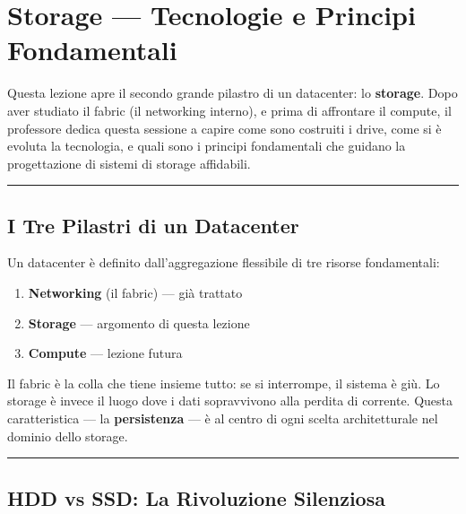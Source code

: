 \documentclass[
  italian,
  openany]{book}
\providecommand{\tightlist}{%
  \setlength{\itemsep}{0pt}\setlength{\parskip}{0pt}}
\begin{document}
\newpage

\chapter{Storage --- Tecnologie e Principi
Fondamentali}\label{storage-tecnologie-e-principi-fondamentali}

Questa lezione apre il secondo grande pilastro di un datacenter: lo
\textbf{storage}. Dopo aver studiato il fabric (il networking interno),
e prima di affrontare il compute, il professore dedica questa sessione a
capire come sono costruiti i drive, come si è evoluta la tecnologia, e
quali sono i principi fondamentali che guidano la progettazione di
sistemi di storage affidabili.

\begin{center}\rule{0.5\linewidth}{0.5pt}\end{center}

\section{I Tre Pilastri di un
Datacenter}\label{i-tre-pilastri-di-un-datacenter}

Un datacenter è definito dall'aggregazione flessibile di tre risorse
fondamentali:

\begin{enumerate}
\def\labelenumi{\arabic{enumi}.}
\tightlist
\item
  \textbf{Networking} (il fabric) --- già trattato
\item
  \textbf{Storage} --- argomento di questa lezione
\item
  \textbf{Compute} --- lezione futura
\end{enumerate}

Il fabric è la colla che tiene insieme tutto: se si interrompe, il
sistema è giù. Lo storage è invece il luogo dove i dati sopravvivono
alla perdita di corrente. Questa caratteristica --- la
\textbf{persistenza} --- è al centro di ogni scelta architetturale nel
dominio dello storage.

\begin{center}\rule{0.5\linewidth}{0.5pt}\end{center}

\section{HDD vs SSD: La Rivoluzione
Silenziosa}\label{hdd-vs-ssd-la-rivoluzione-silenziosa}
\end{document}
